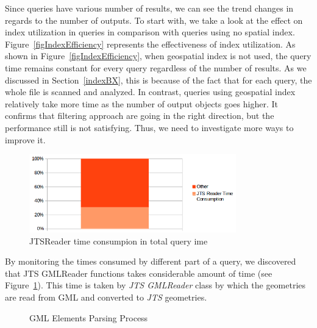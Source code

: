\documentclass[a4paper,12pt]{article}
\begin{document}
Since queries have various number of results, we can see the trend changes in regards to the number of outputs.
To start with, we take a look at the effect on index utilization in queries in comparison with queries using no spatial index. Figure~\ref{figIndexEfficiency} represents the effectiveness of index utilization.
As shown in Figure~\ref{figIndexEfficiency}, when geospatial index is not used, the query time remains constant for every query regardless of the number of results. As we discussed in Section~\ref{indexBX}, this is because of the fact that for each query, the whole file is scanned and analyzed. In contrast, queries using geospatial index relatively take more time as the number of output objects goes higher. It confirms that filtering approach are going in the right direction, but the performance still is not satisfying. Thus, we need to investigate more ways to improve it.
\begin{figure}
\centering
\includegraphics[width=0.8\textwidth]{JTSReadetTimeConsumption}
\caption{JTSReader time consumpion in total query ime}
\label{figJTSReaderTime}
\end{figure}
By monitoring the times consumed by different part of a query, we discovered that JTS GMLReader functions takes considerable amount of time (see Figure~\ref{figJTSReaderTime}). This time is taken by \textit{JTS GMLReader} class by which the geometries are read from GML and converted to \textit{JTS} geometries. 

\begin{figure}
\centering
{}
\centering
{}
\caption{GML Elements Parsing Process}
\label{figParseProcess}
\end{figure}
\end{document}
